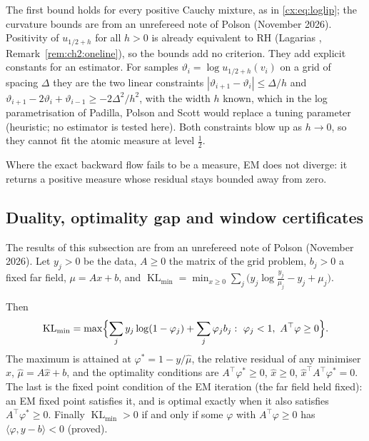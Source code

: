 The first bound holds for every positive Cauchy mixture, as in \eqref{cx:eq:loglip}; the curvature bounds are from an unrefereed note of Polson (November 2026). Positivity of $u_{1/2+h}$ for all $h>0$ is already equivalent to RH (Lagarias \cite{Lagarias}, Remark~\ref{rem:ch2:oneline}), so the bounds add no criterion. They add explicit constants for an estimator. For samples $\vartheta_i=\log u_{1/2+h}(v_i)$ on a grid of spacing $\Delta$ they are the two linear constraints $|\vartheta_{i+1}-\vartheta_i|\le\Delta/h$ and $\vartheta_{i+1}-2\vartheta_i+\vartheta_{i-1}\ge-2\Delta^2/h^2$, with the width $h$ known, which in the log parametrisation of Padilla, Polson and Scott \cite{PadillaPolsonScott18} would replace a tuning parameter (heuristic; no estimator is tested here). Both constraints blow up as $h\to0$, so they cannot fit the atomic measure at level $\tfrac12$.

Where the exact backward flow fails to be a measure, EM does not diverge: it returns a positive measure whose residual stays bounded away from zero.

\subsection{Duality, optimality gap and window certificates}\label{cx:sec:dual}

The results of this subsection are from an unrefereed note of Polson (November 2026). Let $y_j>0$ be the data, $A\ge0$ the matrix of the grid problem, $b_j>0$ a fixed far field, $\mu=Ax+b$, and $\operatorname{KL}_{\min}=\min_{x\ge0}\sum_j\bigl(y_j\log\frac{y_j}{\mu_j}-y_j+\mu_j\bigr)$.

\begin{theorem}\label{cx:thm:dual}
Then
\[
\operatorname{KL}_{\min}=\max\Bigl\{\sum_jy_j\log(1-\varphi_j)+\sum_j\varphi_jb_j:\ \varphi_j<1,\ A^\top\varphi\ge0\Bigr\}.
\]
The maximum is attained at $\varphi^*=1-y/\hat\mu$, the relative residual of any minimiser $\hat x$, $\hat\mu=A\hat x+b$, and the optimality conditions are $A^\top\varphi^*\ge0$, $\hat x\ge0$, $\hat x^\top A^\top\varphi^*=0$. The last is the fixed point condition of the EM iteration (the far field held fixed): an EM fixed point satisfies it, and is optimal exactly when it also satisfies $A^\top\varphi^*\ge0$. Finally $\operatorname{KL}_{\min}>0$ if and only if some $\varphi$ with $A^\top\varphi\ge0$ has $\langle\varphi,y-b\rangle<0$ (proved).
\end{theorem}

